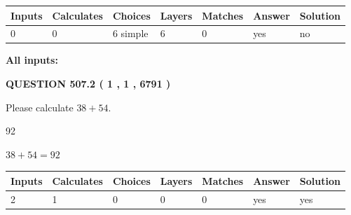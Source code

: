 \documentclass[12pt]{article}
\begin{document}
 
\noindent{}
 
 
   
   
   
   
\noindent\begin{tabular}{|l|l|l|l|l|l|l|}
 \hline
Inputs & Calculates & Choices & Layers & Matches & Answer & Solution \\ \hline
 0  & 
 0  & 
 6
  simple  
  & 
 6  & 
 0  & 
  yes & 
  no 
  \\ \hline
 \end{tabular}
   
   
   
   
\noindent{}
   
   
   
   
\noindent\vspace{0.1in}\hspace{-0.08in} {\textbf{\Large{All inputs: }}}
   
   
  
\vspace{0.2in}
  
{\textbf{\Large{QUESTION
507.2 
 ( 1 , 1 , 6791 )
}}}
  
  
 
Please calculate $ %
38 +  %
54 $.
 
 
 
\noindent{}
 
 

92
 
 
\noindent{}
 
 

 
 
 
\noindent{}
 
 

$ %
38 +  %
54=   %
92$
 
 
\noindent{}
 
 

 
   
   
   
   
\noindent\begin{tabular}{|l|l|l|l|l|l|l|}
 \hline
Inputs & Calculates & Choices & Layers & Matches & Answer & Solution \\ \hline
 2  & 
 1  & 
 0
  & 
 0  & 
 0  & 
  yes & 
  yes 
  \\ \hline
 \end{tabular}
   
\end{document}
